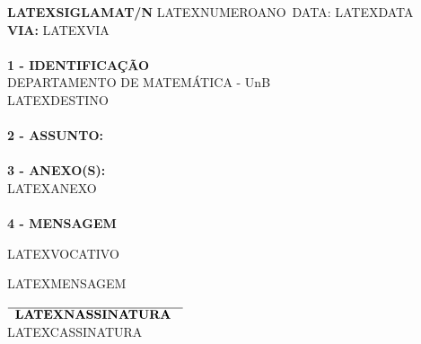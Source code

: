 \documentclass[12pt]{artigo}
\begin{document}
\vspace*{.8cm}
\timbrado
\parindent=2cm 
\setlength{\baselineskip}{5mm}
\noindent 
\begin{minipage}{16cm}
\vspace*{-12mm}
\parindent=2cm
\setlength{\baselineskip}{5mm}
\vspace*{.2cm}
\noindent
\small
{\bf  LATEXSIGLA\/MAT/N\primo} LATEXNUMERO\/ANO\ \hfill {DATA:} {LATEXDATA\ }
\vum \\
{\bf VIA:} {LATEXVIA\ }  
\\
\mbox{} \hrulefill
\\
{\bf 1 - IDENTIFICA\c{C}\~AO} 
\\
\phantom{xxx}{\bf Proced\^encia:} {DEPARTAMENTO DE MATEM\'ATICA - UnB}
\\
 {LATEXDESTINO\ }
\\
\mbox{} \hrulefill\
\\
{\bf 2 - ASSUNTO:} 
\phantom{xxx}{LATEXASSUNTO\ }
\\
\mbox{} \hrulefill
\\
{\bf 3 - ANEXO(S):} 
\\
\phantom{xxx} {LATEXANEXO\ }
\\
\mbox{} \hrulefill
\\
{ \bf 4 - MENSAGEM} 
\end{minipage}
\setlength{\baselineskip}{6mm}
\vspace*{2.5cm} 

LATEXVOCATIVO\,
\vspace*{10mm} 

LATEXMENSAGEM
\vspace*{2.5cm} \\
\hspace*{5.5cm}
\setlength{\baselineskip}{4mm}
\begin{center}
$\overline{\phantom{x}
\mbox{\bf  LATEXNASSINATURA\ }\phantom{x}}$
\\
LATEXCASSINATURA
\end{center}
\end{document}
